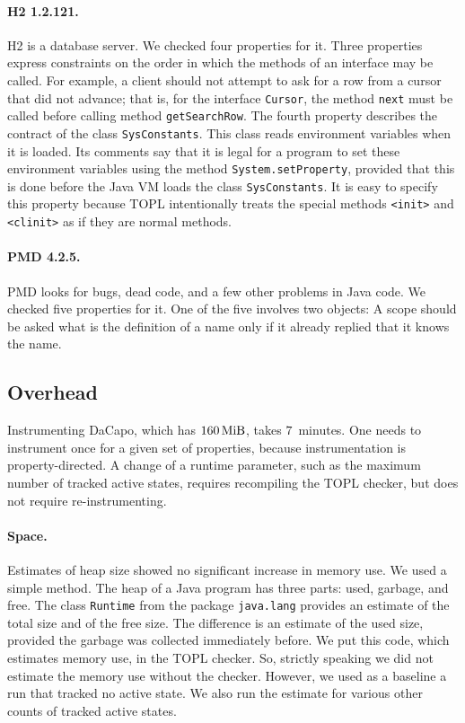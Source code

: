 \documentclass[9pt, preprint]{sigplanconf} %
\theoremstyle{definition}
\theoremstyle{remark}
\begin{document}
\paragraph{H2 1.2.121.}
H2 is a database server.
We checked four properties for it.
Three properties express constraints on the order in which the methods of an interface may be called.
For example, a client should not attempt to ask for a row from a cursor that did not advance;
that is, for the interface {\tt Cursor}, the method {\tt next} must be called before calling method {\tt getSearchRow}.
The fourth property describes the contract of the class {\tt SysConstants}.
This class reads environment variables when it is loaded.
Its comments say that it is legal for a program to set these environment variables using the method {\tt System.setProperty}, provided that this is done before the Java VM loads the class {\tt SysConstants}.
It is easy to specify this property because TOPL intentionally treats the special methods {\tt <init>} and {\tt <clinit>} as if they are normal methods.

\paragraph{PMD 4.2.5.}
PMD looks for bugs, dead code, and a few other problems in Java code.
We checked five properties for it.
One of the five involves two objects:
A scope should be asked what is the definition of a name only if it already replied that it knows the name.

\subsection{Overhead} %

Instrumenting DaCapo, which has $160\rm\,MiB$, takes $7$~minutes.
One needs to instrument once for a given set of properties, because instrumentation is property-directed.
A change of a runtime parameter, such as the maximum number of tracked active states, requires recompiling the TOPL checker, but does not require re-instrumenting.

\paragraph{Space.}
Estimates of heap size showed no significant increase in memory use.
We used a simple method.
The heap of a Java program has three parts: used, garbage, and free.
The class {\tt Runtime} from the package {\tt java.lang} provides an estimate of the total size and of the free size.
The difference is an estimate of the used size, provided the garbage was collected immediately before.
We put this code, which estimates memory use, in the TOPL checker.
So, strictly speaking we did not estimate the memory use without the checker.
However, we used as a baseline a run that tracked no active state.
We also run the estimate for various other counts of tracked active states.
\end{document}
